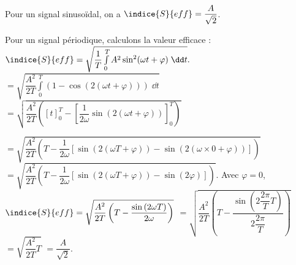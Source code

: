 \begin{resultat}
Pour un signal sinusoïdal, on a $\indice{S}{eff}= \dfrac{A}{\sqrt{2}}$.
\end{resultat}
Pour un signal périodique, calculons la valeur efficace : 
$\indice{S}{eff} = \sqrt{\dfrac{1}{T} \int\limits_{0}^{T} A^2 \sin^2(\omega t + \varphi)\; \dd t}.$
$= \sqrt{\dfrac{ A^2}{2 T} \int\limits_{0}^{T} \left( 1 - \cos\left( 2\left(\omega t + \varphi\right)\right)\right)\; \dd t}$
$= \sqrt{\dfrac{ A^2}{2 T}\left( \left[t\right]_{0}^{T} -  \left[\dfrac{1}{2\omega}\sin\left( 2\left(\omega t + \varphi\right)\right)\right]_{0}^{T}  \right)}$

$= \sqrt{\dfrac{ A^2}{2 T}\left( T -  \dfrac{1}{2\omega}\left[
\sin\left( 2\left(\omega T + \varphi\right)\right)
- \sin\left( 2\left(\omega \times 0 + \varphi\right)\right)\right]  \right)}$
$= \sqrt{\dfrac{ A^2}{2 T}\left( T -  \dfrac{1}{2\omega}\left[
\sin\left( 2\left(\omega T + \varphi\right)\right)
- \sin\left( 2 \varphi\right)\right]  \right)}$. 
Avec $\varphi=0$, 
$\indice{S}{eff}= \sqrt{\dfrac{ A^2}{2 T}\left( T -  \dfrac{\sin\left( 2\omega T \right)}{2\omega}
  \right)}$
  $= \sqrt{\dfrac{ A^2}{2 T}\left( T -  \dfrac{\sin\left( 2\dfrac{2\pi}{T} T \right)}{2\dfrac{2\pi}{T}}  \right)}$
  $= \sqrt{\dfrac{ A^2}{2 T}T }$ $= \dfrac{A}{\sqrt{2}}$.


